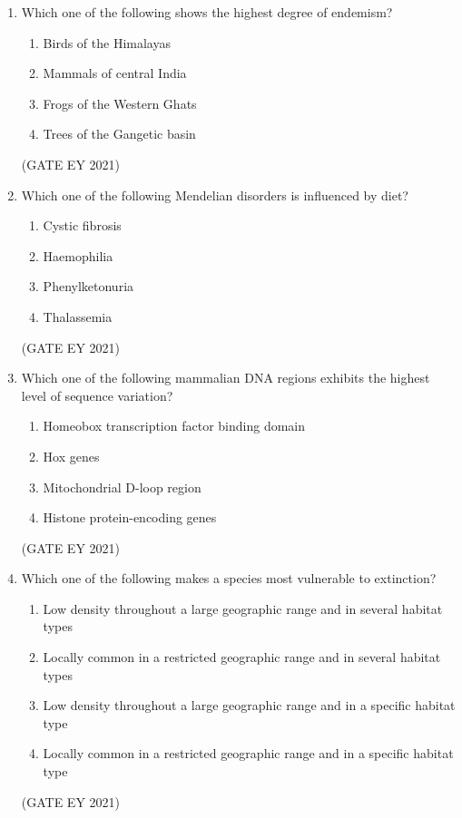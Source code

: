 \documentclass[journal]{IEEEtran}
\begin{document}
\begin{enumerate}
    \item Which one of the following shows the highest degree of endemism?
    \begin{multicols}{2}
    \begin{enumerate}
        \item Birds of the Himalayas
        \item Mammals of central India
        \item Frogs of the Western Ghats
        \item Trees of the Gangetic basin
    \end{enumerate}
    \end{multicols}
    \hfill{(GATE EY 2021)}
    
    \item Which one of the following Mendelian disorders is influenced by diet?
    \begin{multicols}{2}
    \begin{enumerate}
        \item Cystic fibrosis
        \item Haemophilia
        \item Phenylketonuria
        \item Thalassemia
    \end{enumerate}
    \end{multicols}
    \hfill{(GATE EY 2021)}

    \item Which one of the following mammalian DNA regions exhibits the highest level of sequence variation?
    \begin{enumerate}
        \item Homeobox transcription factor binding domain
        \item Hox genes
        \item Mitochondrial D-loop region
        \item Histone protein-encoding genes
    \end{enumerate}
    \hfill{(GATE EY 2021)}

    \item Which one of the following makes a species most vulnerable to extinction?
    \begin{enumerate}
        \item Low density throughout a large geographic range and in several habitat types
        \item Locally common in a restricted geographic range and in several habitat types
        \item Low density throughout a large geographic range and in a specific habitat type
        \item Locally common in a restricted geographic range and in a specific habitat type
    \end{enumerate}
    \hfill{(GATE EY 2021)}


\end{enumerate}
\end{document}
